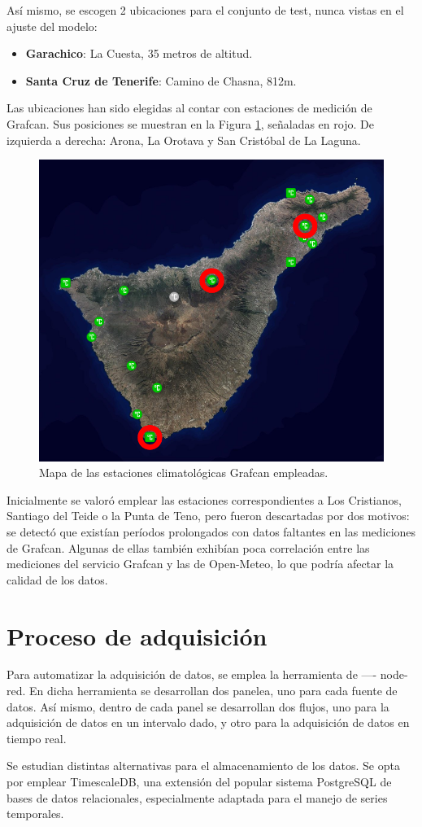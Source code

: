 Así mismo, se escogen 2 ubicaciones para el conjunto de test, nunca vistas en el ajuste del modelo:
\begin{itemize}
    \item \textbf{Garachico}: La Cuesta, 35 metros de altitud.
    \item \textbf{Santa Cruz de Tenerife}: Camino de Chasna, 812m.
\end{itemize}

Las ubicaciones han sido elegidas al contar con estaciones de medición de Grafcan.
Sus posiciones se muestran en la Figura \ref{mapa_estaciones}, señaladas en rojo. De izquierda a derecha: Arona, La Orotava y San Cristóbal de La Laguna.

\begin{figure}[htb]
   \centering
   \includegraphics[width=0.6\linewidth]{images/mapa_estaciones}
   \caption{Mapa de las estaciones climatológicas Grafcan empleadas.}
   \label{mapa_estaciones}
\end{figure}

Inicialmente se valoró emplear las estaciones correspondientes a Los Cristianos, Santiago del Teide o la Punta de Teno, pero fueron descartadas por dos motivos: 
se detectó que existían períodos prolongados con datos faltantes en las mediciones de Grafcan. Algunas de ellas también exhibían poca correlación entre las mediciones
del servicio Grafcan y las de Open-Meteo, lo que podría afectar la calidad de los datos.

\bigskip

\section{Proceso de adquisición}

Para automatizar la adquisición de datos, se emplea la herramienta de ---- node-red. En dicha herramienta se desarrollan dos panelea, uno para cada fuente de datos. 
Así mismo, dentro de cada panel se desarrollan dos flujos, uno para la adquisición de datos en un intervalo dado, y otro para la adquisición de datos en tiempo real.


Se estudian distintas alternativas para el almacenamiento de los datos.
Se opta por emplear TimescaleDB, una extensión del popular sistema PostgreSQL
de bases de datos relacionales, especialmente adaptada para el manejo de series temporales. 

